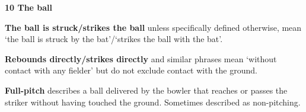 \documentclass[12pt]{article}
\begin{document}
\vspace{\baselineskip}
{\fontsize{16pt}{19.2pt}\selectfont \textbf{10 The ball}\par}\par


\vspace{\baselineskip}
\begin{adjustwidth}{0.4in}{0.4in}
{\fontsize{9pt}{10.8pt} \tabto{0.39in} \textbf{The ball is struck/strikes the ball }unless specifically defined otherwise, mean ‘the ball is struck by the\textbf{ }bat’/‘strikes the ball with the bat’.\par}\par

\end{adjustwidth}


\vspace{\baselineskip}

\vspace{\baselineskip}

\vspace{\baselineskip}

\vspace{\baselineskip}
\begin{Center}
{\fontsize{8pt}{9.6pt}\par}
\end{Center}\par


\vspace{\baselineskip}

\vspace{\baselineskip}
\begin{adjustwidth}{0.4in}{0.25in}
{\fontsize{9pt}{10.8pt} \tabto{0.39in} \textbf{Rebounds directly/strikes directly }and similar phrases mean ‘without contact with any fielder’ but do not\textbf{ }exclude contact with the ground.\par}\par

\end{adjustwidth}


\vspace{\baselineskip}
\begin{adjustwidth}{0.4in}{0.12in}
{\fontsize{9pt}{10.8pt} \tabto{0.39in} \textbf{Full-pitch }describes a ball delivered by the bowler that reaches or passes the striker without having touched\textbf{ }the ground. Sometimes described as non-pitching.\par}\par

\end{adjustwidth}
\end{document}
